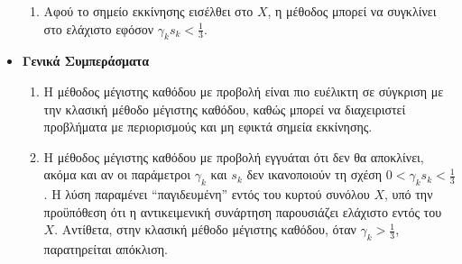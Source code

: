 \documentclass[a4paper,12pt]{article}
\begin{document}
\begin{itemize}
\begin{enumerate}
            \item Αφού το σημείο εκκίνησης εισέλθει στο $X$, η μέθοδος μπορεί να συγκλίνει στο ελάχιστο εφόσον 
            $\gamma_k s_k < \frac{1}{3}$.
        \end{enumerate}
    \item \textbf{Γενικά Συμπεράσματα}
        \begin{enumerate}
            \item Η μέθοδος μέγιστης καθόδου με προβολή είναι πιο ευέλικτη σε σύγκριση με την κλασική μέθοδο μέγιστης 
            καθόδου, καθώς μπορεί να διαχειριστεί προβλήματα με περιορισμούς και μη εφικτά σημεία εκκίνησης.
            
            \item Η μέθοδος μέγιστης καθόδου με προβολή εγγυάται ότι δεν θα αποκλίνει, ακόμα και αν οι παράμετροι 
            $\gamma_k$ και $s_k$ δεν ικανοποιούν τη σχέση $0 < \gamma_k s_k < \frac{1}{3}$. Η λύση παραμένει 
            ``παγιδευμένη'' εντός του κυρτού συνόλου $X$, υπό την προϋπόθεση ότι η αντικειμενική συνάρτηση παρουσιάζει 
            ελάχιστο εντός του $X$. Αντίθετα, στην κλασική μέθοδο μέγιστης καθόδου, όταν $\gamma_k > \frac{1}{3}$, 
            παρατηρείται απόκλιση.
        \end{enumerate}
\end{itemize}
\end{document}
